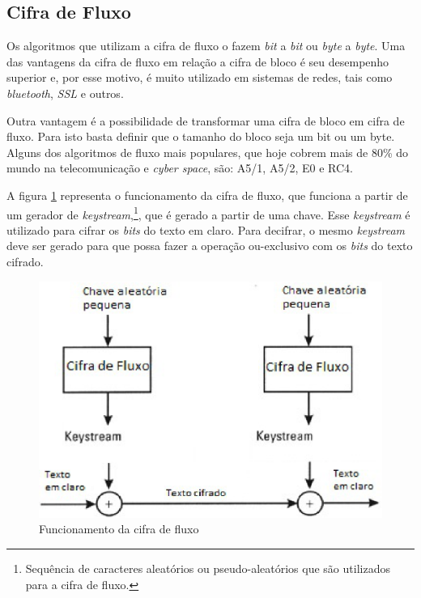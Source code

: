 \subsection{Cifra de Fluxo}
\label{stream-cipher}

Os algoritmos que utilizam a cifra de fluxo o fazem \textit{bit} a \textit{bit} ou \textit{byte} a \textit{byte}. Uma das vantagens da cifra de fluxo em relação a cifra de bloco é seu desempenho superior e, por esse motivo, é muito utilizado em sistemas de redes, tais como \textit{bluetooth}, \textit{SSL} e outros. 

Outra vantagem é a possibilidade de transformar uma cifra de bloco em cifra de fluxo. Para isto basta definir que o tamanho do bloco seja um bit ou um byte. Alguns dos algoritmos de fluxo mais populares, que hoje cobrem mais de 80\% do mundo na telecomunicação e \textit{cyber space}, são: A5/1, A5/2, E0 e RC4. ~\cite{majid-mohd}

A figura \ref{stream-cipher-functioning} representa o  funcionamento da cifra de fluxo, que funciona a partir de um gerador de \textit{keystream},\footnote{Sequência de caracteres aleatórios ou pseudo-aleatórios que são utilizados para a cifra de fluxo.}, que é gerado a partir de uma chave. Esse \textit{keystream} é utilizado para cifrar os \textit{bits}  do texto em claro. Para decifrar, o mesmo \textit{keystream} deve ser gerado para que possa fazer a operação ou-exclusivo com os \textit{bits} do texto cifrado.

\begin{figure}[h]
\centering
\includegraphics[keepaspectratio=true,scale=0.9]
    {figuras/stream_cipher.eps}
    \caption[Funcionamento da cifra de fluxo]{Funcionamento da cifra de fluxo\protect\footnotemark} 
    \label{stream-cipher-functioning}
\end{figure}

